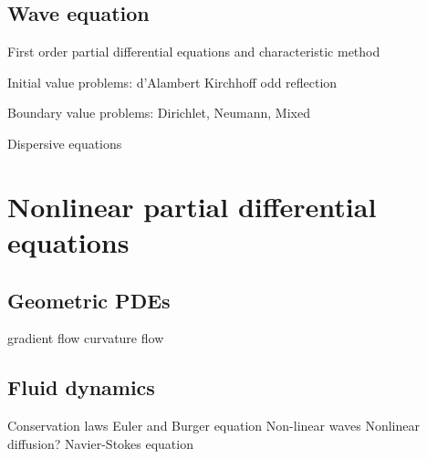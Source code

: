 \documentclass{../../large}
\begin{document}
\section{Wave equation}
First order partial differential equations and characteristic method

Initial value problems:
d'Alambert
Kirchhoff
odd reflection

Boundary value problems:
Dirichlet, Neumann, Mixed

Dispersive equations





\chapter{Nonlinear partial differential equations}



\section{Geometric PDEs}
gradient flow
curvature flow

\section{Fluid dynamics}
Conservation laws
Euler and Burger equation
Non-linear waves
Nonlinear diffusion?
Navier-Stokes equation
\end{document}
